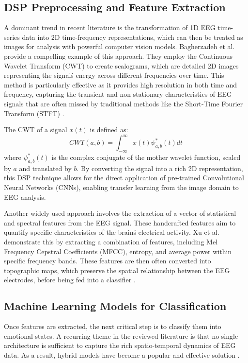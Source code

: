 \documentclass[conference]{IEEEtran}
\begin{document}
\subsection{DSP Preprocessing and Feature Extraction}
A dominant trend in recent literature is the transformation of 1D EEG time-series data into 2D time-frequency representations, which can then be treated as images for analysis with powerful computer vision models. Bagherzadeh et al. \cite{b2} provide a compelling example of this approach. They employ the Continuous Wavelet Transform (CWT) to create scalograms, which are detailed 2D images representing the signal\'s energy across different frequencies over time. This method is particularly effective as it provides high resolution in both time and frequency, capturing the transient and non-stationary characteristics of EEG signals that are often missed by traditional methods like the Short-Time Fourier Transform (STFT) \cite{b3}.

The CWT of a signal $x(t)$ is defined as:
\begin{equation}
CWT(a, b) = \int_{-\infty}^{\infty} x(t) \psi^*_{a,b}(t) dt
\end{equation}
where $\psi^*_{a,b}(t)$ is the complex conjugate of the mother wavelet function, scaled by $a$ and translated by $b$. By converting the signal into a rich 2D representation, this DSP technique allows for the direct application of pre-trained Convolutional Neural Networks (CNNs), enabling transfer learning from the image domain to EEG analysis.

Another widely used approach involves the extraction of a vector of statistical and spectral features from the EEG signal. These handcrafted features aim to quantify specific characteristics of the brain\'s electrical activity. Xu et al. \cite{b4} demonstrate this by extracting a combination of features, including Mel Frequency Cepstral Coefficients (MFCC), entropy, and average power within specific frequency bands. These features are then often converted into topographic maps, which preserve the spatial relationship between the EEG electrodes, before being fed into a classifier \cite{b1}.

\subsection{Machine Learning Models for Classification}
Once features are extracted, the next critical step is to classify them into emotional states. A recurring theme in the reviewed literature is that no single architecture is sufficient to capture the rich spatio-temporal dynamics of EEG data. As a result, hybrid models have become a popular and effective solution \cite{b1, b3, b5}.
\end{document}
